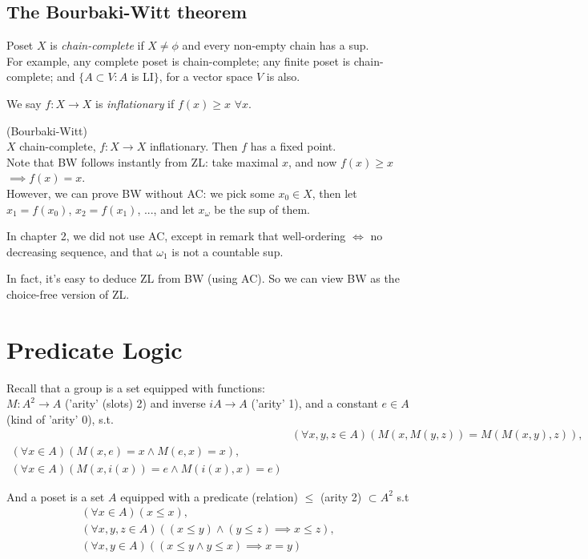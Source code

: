 \documentclass[a4paper]{article}
\begin{document}
\subsection{The Bourbaki-Witt theorem}
Poset $X$ is \emph{chain-complete} if $X \neq \phi$ and every non-empty chain has a sup.\\
For example, any complete poset is chain-complete; any finite poset is chain-complete; and $\{A \subset V: A$ is LI$\}$, for a vector space $V$ is also.

We say $f:X \to X$ is \emph{inflationary} if $f(x) \geq x$ $\forall x$.

\begin{thm} (Bourbaki-Witt)\\
$X$ chain-complete, $f:X \to X$ inflationary. Then $f$ has a fixed point.\\
Note that BW follows instantly from ZL: take maximal $x$, and now $f(x) \geq x$ $\implies f(x) = x$.\\
However, we can prove BW without AC: we pick some $x_0 \in X$, then let $x_1 = f(x_0)$, $x_2 = f(x_1)$, ..., and let $x_\omega$ be the sup of them.

In chapter 2, we did not use AC, except in remark that well-ordering $\iff$ no decreasing sequence, and that $\omega_1$ is not a countable sup.
\end{thm}

In fact, it's easy to deduce ZL from BW (using AC). So we can view BW as the choice-free version of ZL.

\newpage
\section{Predicate Logic}
Recall that a group is a set equipped with functions:\\
$M:A^2 \to A$ ('arity' (slots) 2) and inverse $iA \to A$ ('arity' 1), and a constant $e \in A$ (kind of 'arity' 0), s.t.
\begin{equation*}
\begin{aligned}
& (\forall x,y,z \in A) (M(x,M(y,z)) = M(M(x,y),z)),\\
(\forall x \in A) (M(x,e) = x \wedge M(e,x) = x),\\
(\forall x \in A) (M(x,i(x)) = e \wedge M(i(x),x) = e)
\end{aligned}
\end{equation*}

And a poset is a set $A$ equipped with a predicate (relation) $\leq$ (arity 2) $\subset A^2$ s.t\\
\begin{equation*}
\begin{aligned}
(\forall x \in A) (x \leq x),\\
(\forall x,y,z \in A) ((x \leq y) \wedge (y \leq z) \implies x \leq z),\\
(\forall x,y \in A) ((x \leq y \wedge y \leq x) \implies x = y)
\end{aligned}
\end{equation*}
\end{document}
